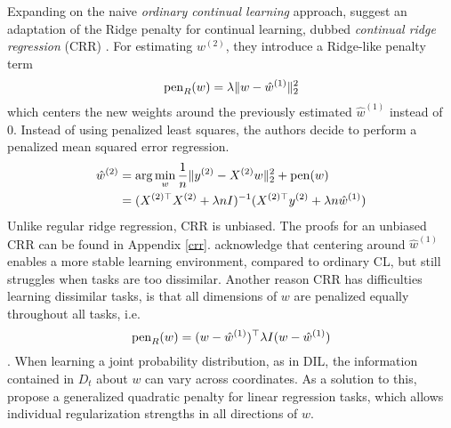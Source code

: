 Expanding on the naive \textit{ordinary continual learning} approach, \citeauthor{li2024fixeddesignanalysisregularizationbased} \cite{li2024fixeddesignanalysisregularizationbased} suggest an adaptation of the Ridge penalty for continual learning, dubbed \textit{continual ridge regression} (CRR) \cite{li2024fixeddesignanalysisregularizationbased, zhao2024statisticaltheoryregularizationbasedcontinual}. For estimating $w^{(2)}$, they introduce a Ridge-like penalty term
\begin{equation}\label{ridge}
	\operatorname{pen}_{R}(w) = \lambda\lVert w - \hat{w}^{(1)}\rVert_2^2
\end{equation}
which centers the new weights around the previously estimated $\hat{w}^{(1)}$ instead of 0. Instead of using penalized least squares, the authors decide to perform a penalized mean squared error regression. %
\begin{equation}
	\begin{split}
		\hat{w}^{(2)} &= \arg\min_{w} \frac{1}{n}\lVert y^{(2)} - X^{(2)}w\rVert_2^2 + \operatorname{pen}(w) \\
		&= (X^{(2)\top} X^{(2)}+\lambda n I)^{-1}(X^{(2)\top} y^{(2)} +\lambda n \hat{w}^{(1)})
	\end{split}
\end{equation}
Unlike regular ridge regression, CRR is unbiased. The proofs for an unbiased CRR can be found in Appendix \ref{crr}. \citeauthor{li2024fixeddesignanalysisregularizationbased} acknowledge that centering around $\hat{w}^{(1)}$ enables a more stable learning environment, compared to ordinary CL, but still struggles when tasks are too dissimilar. Another reason CRR has difficulties learning dissimilar tasks, is that all dimensions of $w$ are penalized equally throughout all tasks, i.e.
\begin{equation}\label{ridgeMat}
	\operatorname{pen}_R(w) = (w - \hat{w}^{(1)})^\top \lambda I (w - \hat{w}^{(1)})
\end{equation} . When learning a joint probability distribution, as in DIL, the information contained in $D_t$ about $w$ can vary across coordinates.
As a solution to this, \citeauthor{zhao2024statisticaltheoryregularizationbasedcontinual} \cite{zhao2024statisticaltheoryregularizationbasedcontinual} propose a generalized quadratic penalty for linear regression tasks, which allows individual regularization strengths in all directions of $w$. 

